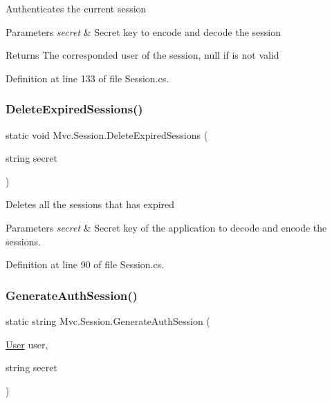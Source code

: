 Authenticates the current session 


\begin{DoxyParams}{Parameters}
{\em secret} & Secret key to encode and decode the session\\
\hline
\end{DoxyParams}
\begin{DoxyReturn}{Returns}
The corresponded user of the session, null if is not valid
\end{DoxyReturn}


Definition at line 133 of file Session.\+cs.

\mbox{\label{class_mvc_1_1_session_a0dd0abe92e2b3450210cfc92dfbd9ca3}} 
\subsubsection{\texorpdfstring{Delete\+Expired\+Sessions()}{DeleteExpiredSessions()}}
{\footnotesize\ttfamily static void Mvc.\+Session.\+Delete\+Expired\+Sessions (\begin{DoxyParamCaption}\item[{string}]{secret }\end{DoxyParamCaption})\hspace{0.3cm}{\ttfamily [static]}}



Deletes all the sessions that has expired 


\begin{DoxyParams}{Parameters}
{\em secret} & Secret key of the application to decode and encode the sessions.\\
\hline
\end{DoxyParams}


Definition at line 90 of file Session.\+cs.

\mbox{\label{class_mvc_1_1_session_aeb7476f51d94c0d95d997b5b1ae85f46}} 
\subsubsection{\texorpdfstring{Generate\+Auth\+Session()}{GenerateAuthSession()}}
{\footnotesize\ttfamily static string Mvc.\+Session.\+Generate\+Auth\+Session (\begin{DoxyParamCaption}\item[{\hyperlink{class_mvc_1_1_user}{User}}]{user,  }\item[{string}]{secret }\end{DoxyParamCaption})\hspace{0.3cm}{\ttfamily [static]}}



